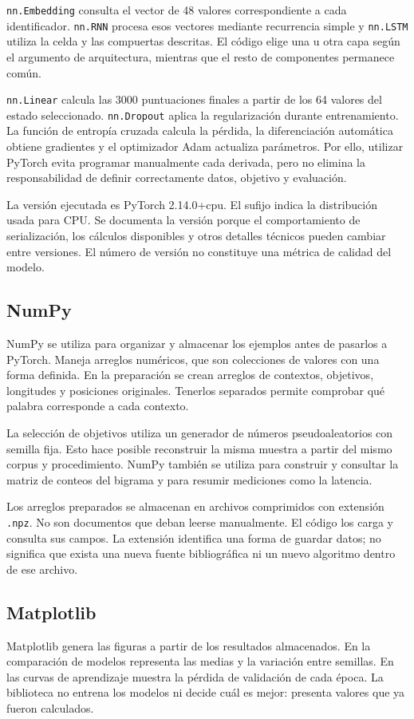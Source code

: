 \texttt{nn.Embedding} consulta el vector de 48 valores correspondiente a cada identificador. \texttt{nn.RNN} procesa esos vectores mediante recurrencia simple y \texttt{nn.LSTM} utiliza la celda y las compuertas descritas. El código elige una u otra capa según el argumento de arquitectura, mientras que el resto de componentes permanece común.

\texttt{nn.Linear} calcula las 3000 puntuaciones finales a partir de los 64 valores del estado seleccionado. \texttt{nn.Dropout} aplica la regularización durante entrenamiento. La función de entropía cruzada calcula la pérdida, la diferenciación automática obtiene gradientes y el optimizador Adam actualiza parámetros. Por ello, utilizar PyTorch evita programar manualmente cada derivada, pero no elimina la responsabilidad de definir correctamente datos, objetivo y evaluación.

La versión ejecutada es PyTorch 2.14.0+cpu. El sufijo indica la distribución usada para CPU. Se documenta la versión porque el comportamiento de serialización, los cálculos disponibles y otros detalles técnicos pueden cambiar entre versiones. El número de versión no constituye una métrica de calidad del modelo.

\subsection{NumPy}
NumPy se utiliza para organizar y almacenar los ejemplos antes de pasarlos a PyTorch. Maneja arreglos numéricos, que son colecciones de valores con una forma definida. En la preparación se crean arreglos de contextos, objetivos, longitudes y posiciones originales. Tenerlos separados permite comprobar qué palabra corresponde a cada contexto.

La selección de objetivos utiliza un generador de números pseudoaleatorios con semilla fija. Esto hace posible reconstruir la misma muestra a partir del mismo corpus y procedimiento. NumPy también se utiliza para construir y consultar la matriz de conteos del bigrama y para resumir mediciones como la latencia.

Los arreglos preparados se almacenan en archivos comprimidos con extensión \texttt{.npz}. No son documentos que deban leerse manualmente. El código los carga y consulta sus campos. La extensión identifica una forma de guardar datos; no significa que exista una nueva fuente bibliográfica ni un nuevo algoritmo dentro de ese archivo.

\subsection{Matplotlib}
Matplotlib genera las figuras a partir de los resultados almacenados. En la comparación de modelos representa las medias y la variación entre semillas. En las curvas de aprendizaje muestra la pérdida de validación de cada época. La biblioteca no entrena los modelos ni decide cuál es mejor: presenta valores que ya fueron calculados.

